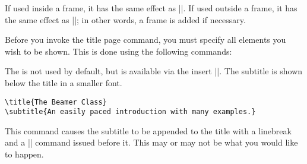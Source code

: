 \begin{command}{\maketitle}
  \beamernote
  If used inside a frame, it has the same effect as |\titlepage|. If
  used outside a frame, it has the same effect as
  |\frame{\titlepage}|; in other words, a frame is added if necessary.
\end{command}


Before you invoke the title page command, you must specify all
elements you wish to be shown. This is done using the following
commands: 


\begin{command}{\subtitle{}}
  The  is not used by default, but is available
  via the insert |\insertshortsubtitle|. The subtitle is shown below
  the title in a smaller font.
  \example
\begin{verbatim}
\title{The Beamer Class}
\subtitle{An easily paced introduction with many examples.}
\end{verbatim}

  \articlenote
  This command causes the subtitle to be appended to the title with a
  linebreak and a |\normalsize| command issued before it. This may or
  may not be what you would like to happen.
\end{command}


